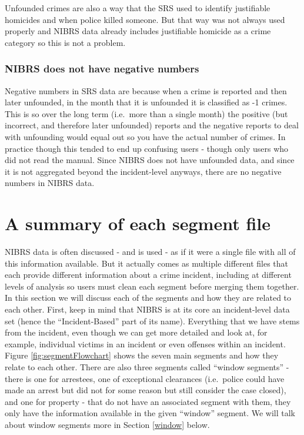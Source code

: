 \documentclass[
]{krantz}
\begin{document}
Unfounded crimes are also a way that the SRS used to
identify justifiable homicides and when police killed
someone. But that way was not always used properly and NIBRS
data already includes justifiable homicide as a crime
category so this is not a problem.

\subsubsection{NIBRS does not have negative
numbers}\label{nibrs-does-not-have-negative-numbers}

Negative numbers in SRS data are because when a crime is
reported and then later unfounded, in the month that it is
unfounded it is classified as -1 crimes. This is so over the
long term (i.e.~more than a single month) the positive (but
incorrect, and therefore later unfounded) reports and the
negative reports to deal with unfounding would equal out so
you have the actual number of crimes. In practice though
this tended to end up confusing users - though only users
who did not read the manual. Since NIBRS does not have
unfounded data, and since it is not aggregated beyond the
incident-level anyways, there are no negative numbers in
NIBRS data.

\section{A summary of each segment
file}\label{a-summary-of-each-segment-file}

NIBRS data is often discussed - and is used - as if it were
a single file with all of this information available. But it
actually comes as multiple different files that each provide
different information about a crime incident, including at
different levels of analysis so users must clean each
segment before merging them together. In this section we
will discuss each of the segments and how they are related
to each other. First, keep in mind that NIBRS is at its core
an incident-level data set (hence the ``Incident-Based'' part
of its name). Everything that we have stems from the
incident, even though we can get more detailed and look at,
for example, individual victims in an incident or even
offenses within an incident. Figure
\ref{fig:segmentFlowchart} shows the seven main segments and
how they relate to each other. There are also three segments
called ``window segments'' - there is one for arrestees, one
of exceptional clearances (i.e.~police could have made an
arrest but did not for some reason but still consider the
case closed), and one for property - that do not have an
associated segment with them, they only have the information
available in the given ``window'' segment. We will talk
about window segments more in Section \ref{window} below.
\end{document}
